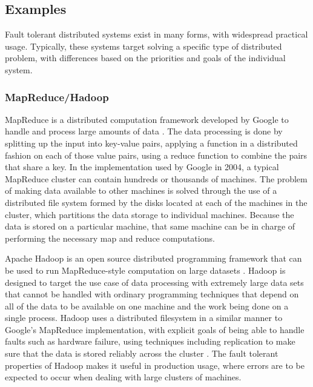 \documentclass[twoside]{report}
\begin{document}

\subsection{Examples}
Fault tolerant distributed systems exist in many forms, with widespread practical usage.
Typically, these systems target solving a specific type of distributed problem, with differences based on the priorities and goals of the individual system.

\subsubsection{MapReduce/Hadoop}
MapReduce is a distributed computation framework developed by Google to handle and process large amounts of data \cite{dean2004mapreduce}.
The data processing is done by splitting up the input into key-value pairs, applying a function in a distributed fashion on each of those value pairs, using a reduce function to combine the pairs that share a key.
In the implementation used by Google in 2004, a typical MapReduce cluster can contain hundreds or thousands of machines.
The problem of making data available to other machines is solved through the use of a distributed file system formed by the disks located at each of the machines in the cluster, which partitions the data storage to individual machines.
Because the data is stored on a particular machine, that same machine can be in charge of performing the necessary map and reduce computations.

Apache Hadoop is an open source distributed programming framework that can be used to run MapReduce-style computation on large datasets \cite{Hadoop}.
Hadoop is designed to target the use case of data processing with extremely large data sets that cannot be handled with ordinary programming techniques that depend on all of the data to be available on one machine and the work being done on a single process.
Hadoop uses a distributed filesystem in a similar manner to Google's MapReduce implementation, with explicit goals of being able to handle faults such as hardware failure, using techniques including replication to make sure that the data is stored reliably across the cluster \cite{borthakur2007hadoop}.
The fault tolerant properties of Hadoop makes it useful in production usage, where errors are to be expected to occur when dealing with large clusters of machines.
\end{document}
